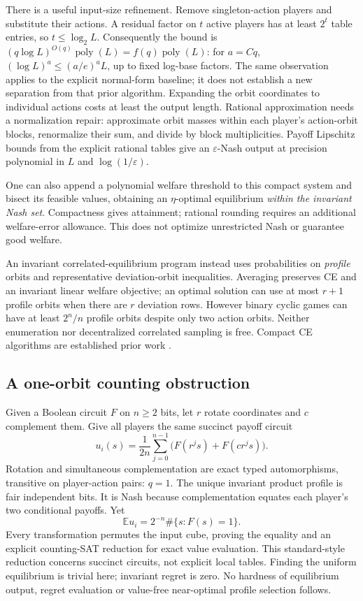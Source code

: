 There is a useful input-size refinement. Remove singleton-action players and
substitute their actions. A residual factor on $t$ active players has at least
$2^t$ table entries, so $t\le\log_2 L$. Consequently the bound is
$(q\log L)^{O(q)}\operatorname{poly}(L)=f(q)\operatorname{poly}(L)$:
for $a=Cq$, $(\log L)^a\le(a/e)^aL$, up to fixed log-base factors.
The same observation applies to the explicit normal-form baseline; it does
not establish a new separation from that prior algorithm. Expanding the
orbit coordinates to individual actions costs at least the output length.
Rational approximation needs a normalization repair: approximate orbit
masses within each player's action-orbit blocks, renormalize their sum, and
divide by block multiplicities. Payoff Lipschitz bounds from the explicit
rational tables give an $\varepsilon$-Nash output at precision polynomial in
$L$ and $\log(1/\varepsilon)$.

One can also append a polynomial welfare threshold to this compact system
and bisect its feasible values, obtaining an $\eta$-optimal equilibrium
\emph{within the invariant Nash set}. Compactness gives attainment; rational
rounding requires an additional welfare-error allowance. This does not
optimize unrestricted Nash or guarantee good welfare.

An invariant correlated-equilibrium program instead uses probabilities on
\emph{profile} orbits and representative deviation-orbit inequalities.
Averaging preserves CE and an invariant linear welfare objective; an optimal
solution can use at most $r+1$ profile orbits when there are $r$ deviation rows.
However binary cyclic games can have at least $2^n/n$ profile orbits despite
only two action orbits. Neither enumeration nor decentralized correlated
sampling is free. Compact CE algorithms are established prior
work \citep{papadimitriou2008,jiang2011}.

\subsection{A one-orbit counting obstruction}
Given a Boolean circuit $F$ on $n\ge2$ bits, let $r$ rotate coordinates and
$c$ complement them. Give all players the same succinct payoff circuit
\[
 u_i(s)=\frac1{2n}\sum_{j=0}^{n-1}\bigl(F(r^js)+F(cr^js)\bigr).
\]
Rotation and simultaneous complementation are exact typed automorphisms,
transitive on player-action pairs: $q=1$. The unique invariant product profile
is fair independent bits. It is Nash because complementation equates each
player's two conditional payoffs. Yet
\[
 \mathbb E u_i=2^{-n}\#\{s:F(s)=1\}.
\]
Every transformation permutes the input cube, proving the equality and an
explicit counting-SAT reduction for exact value evaluation. This standard-style
reduction concerns succinct circuits, not explicit local tables. Finding the
uniform equilibrium is trivial here; invariant regret is zero. No hardness
of equilibrium output, regret evaluation or value-free near-optimal profile
selection follows.


